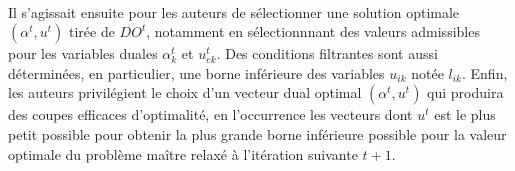 \paragraph{}Il s'agissait ensuite pour les auteurs de sélectionner une solution optimale $(\alpha^t, u^t)$ tirée de $DO^t$, notamment en sélectionnnant des valeurs admissibles pour les variables duales $\alpha^t_k$ et $u^t_{ek}$. Des conditions filtrantes sont aussi déterminées, en particulier, une borne inférieure des variables $u_{ik}$ notée $l_{ik}$.
Enfin, les auteurs privilégient le choix d'un vecteur dual optimal $(\alpha^t, u^t)$ qui
produira des coupes efficaces d'optimalité, en l'occurrence les vecteurs dont $u^t$ est le plus petit possible pour obtenir la plus grande borne inférieure possible pour la valeur optimale du problème maître relaxé à l'itération suivante $t+1$.

